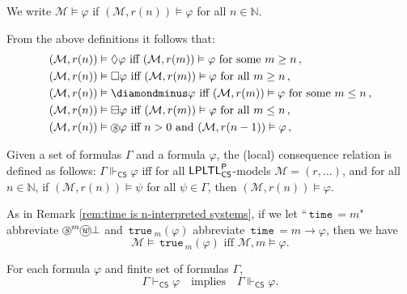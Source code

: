 \documentclass[envcountsect,envcountsame,oribibl,orivec]{llncs}
\newcommand*\circled[1]{\tikz[baseline=(char.base)]{
		\node[shape=circle,draw,inner sep=0.4pt] (char) {#1};}}
\newcommand{\lalways}{\Box}
\newcommand{\leventually}{\Diamond}
\newcommand{\lonce}{\diamondminus}
\newcommand{\lsofar}{\boxminus}
\newcommand{\ltime}{{\,\texttt{time}\,}}
\newcommand{\ltrue}{{\,\texttt{true}\,}}
\newcommand{\wprevious}{\circled{\textit{w}}}
\newcommand{\sprevious}{\circled{\textit{s}}}
\newcommand{\LPLTLp}{\textsf{LPLTL}^{\sf P}}
\newcommand{\CS}{\textsf{CS}}
\newcommand{\entails}{\vDash}
\newcommand{\M}{\mathcal{M}}
\newcommand{\N}{\mathbb{N}}
\renewcommand{\phi}{\varphi}
\begin{document}
We write $\M \entails \phi$ if $(\M, r(n)) \entails \phi$ for all $n \in \N$. 

From the above definitions it follows that: 
\begin{align*}
(\M, r(n)) &\entails \leventually \phi \text{ iff } (\M, r(m)) \entails \phi \text{ for some } m\geq n \, ,\\
(\M, r(n)) &\entails \lalways \phi \text{ iff } (\M, r(m)) \entails \phi \text{ for all } m\geq n \, ,\\
(\M, r(n)) &\entails \lonce \phi \text{ iff } (\M, r(m)) \entails \phi \text{ for some } m \leq n \, ,\\
(\M, r(n)) &\entails \lsofar \phi \text{ iff } (\M, r(m)) \entails \phi \text{ for all } m \leq n \, ,\\
(\M, r(n)) &\entails \sprevious \phi \text{ iff $n>0$ and } (\M, r(n-1)) \entails \phi  \, ,\\
\end{align*}


\begin{definition}
	Given a set of formulas $\Gamma$ and a formula $\phi$, the (local) consequence relation is defined as follows: $\Gamma \Vdash_\CS \phi$ iff for all 
	$\LPLTLp_\CS$-models $\M = (r , \ldots)$, and for all $ n \in \N$, if $(\M, r(n)) \entails \psi$ for all $\psi \in \Gamma$, then $(\M, r(n)) \entails \phi$.
\end{definition}

\begin{remark}
	As in Remark \ref{rem:time is n-interpreted systems}, if we let ``$\ltime=m$" abbreviate $\sprevious^m \wprevious \bot$ and $\ltrue_m (\phi)$ abbreviate $\ltime = m \to \phi$, then we have
	\[
	\M \models \ltrue_m (\phi) \text{ iff } \M, m \models \phi.
	\]
\end{remark}




\begin{theorem}[Soundness]
		For each formula $\phi$ and finite set of formulas $\Gamma$,
	\[
	\Gamma\vdash_\CS \phi  \quad\text{implies}\quad  \Gamma \Vdash_\CS  \phi.
	\]
\end{theorem}


\end{document}
